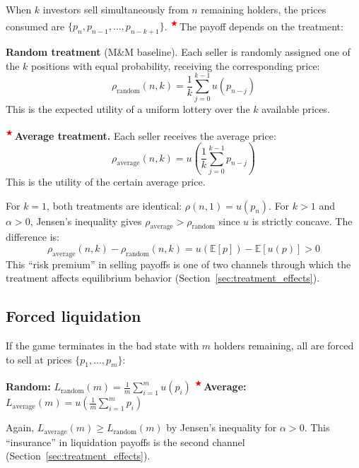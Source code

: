 \documentclass[11pt]{article}
\newcommand{\extension}{\textsuperscript{\textcolor{red}{$\bigstar$}}\,}
\begin{document}
When $k$ investors sell simultaneously from $n$ remaining holders, the prices
consumed are $\{p_n, p_{n-1}, \ldots, p_{n-k+1}\}$. \extension The payoff
depends on the treatment:

\textbf{Random treatment} (M\&M baseline). Each seller is randomly assigned
one of the $k$ positions with equal probability, receiving the corresponding
price:
\begin{equation}
    \rho_{\text{random}}(n, k)
    = \frac{1}{k} \sum_{j=0}^{k-1} u(p_{n-j})
    \label{eq:rho_random}
\end{equation}
This is the expected utility of a uniform lottery over the $k$ available prices.

\extension \textbf{Average treatment.} Each seller receives the average
price:
\begin{equation}
    \rho_{\text{average}}(n, k)
    = u\!\left(\frac{1}{k} \sum_{j=0}^{k-1} p_{n-j}\right)
    \label{eq:rho_average}
\end{equation}
This is the utility of the certain average price.

For $k = 1$, both treatments are identical: $\rho(n, 1) = u(p_n)$. For
$k > 1$ and $\alpha > 0$, Jensen's inequality gives
$\rho_{\text{average}} > \rho_{\text{random}}$ since $u$ is strictly
concave. The difference is:
\begin{equation}
    \rho_{\text{average}}(n, k) - \rho_{\text{random}}(n, k)
    = u\!\left(\mathbb{E}[p]\right) - \mathbb{E}\!\left[u(p)\right] > 0
    \label{eq:jensen_selling}
\end{equation}
This ``risk premium'' in selling payoffs is one of two channels through
which the treatment affects equilibrium behavior
(Section~\ref{sec:treatment_effects}).

\subsection{Forced liquidation}

If the game terminates in the bad state with $m$ holders remaining, all are
forced to sell at prices $\{p_1, \ldots, p_m\}$:

\textbf{Random:} $\displaystyle
L_{\text{random}}(m) = \frac{1}{m} \sum_{i=1}^{m} u(p_i)$
\qquad
\extension \textbf{Average:} $\displaystyle
L_{\text{average}}(m) = u\!\left(\frac{1}{m} \sum_{i=1}^{m} p_i\right)$

Again, $L_{\text{average}}(m) \geq L_{\text{random}}(m)$ by Jensen's
inequality for $\alpha > 0$. This ``insurance'' in liquidation payoffs
is the second channel (Section~\ref{sec:treatment_effects}).
\end{document}
